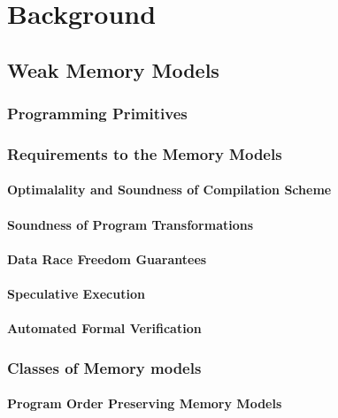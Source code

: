 \chapter{Background}
\label{ch:review}


\section{Weak Memory Models}
\label{sec:models-intro}

\subsection{Programming Primitives}
\label{sec:models-primitives}

\subsection{Requirements to the Memory Models}
\label{sec:models-requirements}

\subsubsection*{Optimalality and Soundness of Compilation Scheme}

\subsubsection*{Soundness of Program Transformations}

\subsubsection*{Data Race Freedom Guarantees}

\subsubsection*{Speculative Execution}

\subsubsection*{Automated Formal Verification}

\subsection{Classes of Memory models}
\label{sec:models-classes}

\subsubsection*{Program Order Preserving Memory Models}

